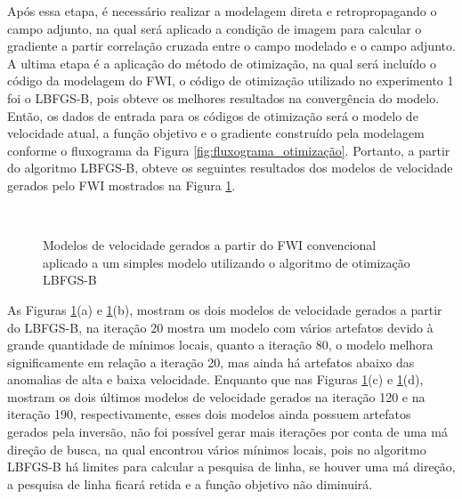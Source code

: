 Após essa etapa, é necessário realizar a modelagem direta e retropropagando o campo adjunto, na qual será aplicado a condição de imagem para calcular o gradiente a partir correlação cruzada entre o campo modelado e o campo adjunto. A ultima etapa é a aplicação do método de otimização, na qual será incluído o código da modelagem do FWI, o código de otimização utilizado no experimento 1 foi o LBFGS-B, pois obteve os melhores resultados na convergência do modelo. Então, os dados de entrada para os códigos de otimização será o modelo de velocidade atual, a função objetivo e o gradiente construído pela modelagem conforme o fluxograma da Figura \ref{fig:fluxograma_otimização}. Portanto, a partir do algoritmo LBFGS-B, obteve os seguintes resultados dos modelos de velocidade gerados pelo FWI mostrados na Figura \ref{fig:experimento1}. 
 \\




\begin{figure}[h!]
  \centering
   \\
    \caption{Modelos de velocidade gerados a partir do FWI convencional aplicado a um simples modelo utilizando o algoritmo de otimização LBFGS-B  }
    \label{fig:experimento1}
\end{figure}


As Figuras \ref{fig:experimento1}(a) e \ref{fig:experimento1}(b), mostram os dois modelos de velocidade gerados a partir do LBFGS-B, na iteração 20 mostra um modelo com vários artefatos devido à grande quantidade de mínimos locais, quanto a iteração 80, o modelo melhora significamente em relação a iteração 20, mas ainda há artefatos abaixo das anomalias de alta e baixa velocidade. Enquanto que nas Figuras  \ref{fig:experimento1}(c) e \ref{fig:experimento1}(d), mostram os dois últimos modelos de velocidade gerados na iteração 120 e na iteração 190, respectivamente, esses dois modelos ainda possuem artefatos gerados pela inversão, não foi possível gerar mais iterações por conta de uma má direção de busca, na qual encontrou vários mínimos locais, pois no algoritmo LBFGS-B há limites para calcular a pesquisa de linha, se houver uma má direção, a pesquisa de linha ficará retida e a função objetivo não diminuirá. 

